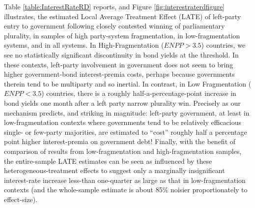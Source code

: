 \documentclass[12pt]{article}
\begin{document}
Table \ref{table:InterestRateRD} reports, and Figure  \ref{fig:interestraterdfigure} illustrates, the estimated Local Average Treatment Effect (LATE) of left-party entry to government following closely contested winning of parliamentary plurality, in samples of high party-system fragmentation, in low-fragmentation systems, and in all systems. In High-Fragmentation ($ENPP > 3.5$) countries, we see no statistically significant discontinuity in bond yields at the threshold. In these contexts, left-party involvement in government does not seem to bring higher government-bond interest-premia costs, perhaps because governments therein tend to be multiparty and so inertial. In contrast, in Low Fragmentation ($ENPP < 3.5$) countries, there is a roughly half-a-percentage-point increase in bond yields one month after a left party narrow plurality win. Precisely as our mechanism predicts, and striking in magnitude: left-party government, at least in low-fragmentation contexts where governments tend to be relatively efficacious single- or few-party majorities, are estimated to ``cost'' roughly half a percentage point higher interest-premia on government debt! Finally, with the benefit of comparison of results from low-fragmentation and high-fragmentation samples, the entire-sample LATE estimates can be seen as influenced by these heterogeneous-treatment effects to suggest only a marginally insignificant interest-rate increase less-than one-quarter as large as that in low-fragmentation contexts (and the whole-sample estimate is about 85\% noisier proportionately to effect-size).
\end{document}
